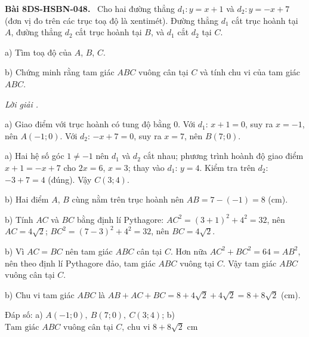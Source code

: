 \documentclass[12pt,a4paper]{article}
\newenvironment{problem}[1][]{\par\medskip\noindent\textbf{Bài #1.}\ }{\par}
\newenvironment{solution}[1][]{\par\noindent\textit{Lời giải #1.}\par}{\par}
\begin{document}
\begin{problem}[8DS-HSBN-048]
Cho hai đường thẳng $d_1\colon y = x + 1$ và $d_2\colon y = -x + 7$ (đơn vị đo trên các trục toạ độ là xentimét). Đường thẳng $d_1$ cắt trục hoành tại $A$, đường thẳng $d_2$ cắt trục hoành tại $B$, và $d_1$ cắt $d_2$ tại $C$.

a) Tìm toạ độ của $A$, $B$, $C$.

b) Chứng minh rằng tam giác $ABC$ vuông cân tại $C$ và tính chu vi của tam giác $ABC$.

\begin{solution}
a) Giao điểm với trục hoành có tung độ bằng $0$. Với $d_1$: $x + 1 = 0$, suy ra $x = -1$, nên $A(-1; 0)$. Với $d_2$: $-x + 7 = 0$, suy ra $x = 7$, nên $B(7; 0)$.

a) Hai hệ số góc $1 \neq -1$ nên $d_1$ và $d_2$ cắt nhau; phương trình hoành độ giao điểm $x + 1 = -x + 7$ cho $2x = 6$, $x = 3$; thay vào $d_1$: $y = 4$. Kiểm tra trên $d_2$: $-3 + 7 = 4$ (đúng). Vậy $C(3; 4)$.

b) Hai điểm $A$, $B$ cùng nằm trên trục hoành nên $AB = 7 - (-1) = 8$ (cm).

b) Tính $AC$ và $BC$ bằng định lí Pythagore: $AC^2 = (3 + 1)^2 + 4^2 = 32$, nên $AC = 4\sqrt{2}$; $BC^2 = (7 - 3)^2 + 4^2 = 32$, nên $BC = 4\sqrt{2}$.

b) Vì $AC = BC$ nên tam giác $ABC$ cân tại $C$. Hơn nữa $AC^2 + BC^2 = 64 = AB^2$, nên theo định lí Pythagore đảo, tam giác $ABC$ vuông tại $C$. Vậy tam giác $ABC$ vuông cân tại $C$.

b) Chu vi tam giác $ABC$ là $AB + AC + BC = 8 + 4\sqrt{2} + 4\sqrt{2} = 8 + 8\sqrt{2}$ (cm).

Đáp số: a) $\boxed{A(-1; 0),\ B(7; 0),\ C(3; 4)}$; b) $\boxed{\text{Tam giác } ABC \text{ vuông cân tại } C,\ \text{chu vi } 8 + 8\sqrt{2} \text{ cm}}$
\end{solution}
\end{problem}
\end{document}
